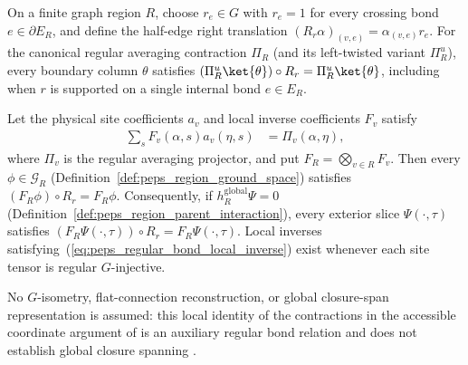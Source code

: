\begin{lemma}%
    \label{lem:peps_regular_region_bond_right_invariance}
    \leanok
    On a finite graph region $R$, choose $r_e\in G$ with $r_e=1$ for every
    crossing bond $e\in\partial E_R$, and define the half-edge right
    translation $(R_r\alpha)_{(v,e)}=\alpha_{(v,e)}r_e$. For the canonical
    regular averaging contraction $\Pi_R$ (and its left-twisted variant
    $\Pi_R^u$), every boundary column $\theta$ satisfies
    $(\Pi_R^u\ket{\theta})\circ R_r=\Pi_R^u\ket{\theta}$, including when $r$
    is supported on a single internal bond $e\in E_R$.

    Let the physical site coefficients $a_v$ and local inverse coefficients
    $F_v$ satisfy
    \begin{align}
        \sum_s F_v(\alpha,s)a_v(\eta,s) & = \Pi_v(\alpha,\eta),
        \label{eq:peps_regular_bond_local_inverse}
    \end{align}
    where $\Pi_v$ is the regular averaging projector, and put
    $F_R=\bigotimes_{v\in R}F_v$. Then every $\phi\in\mathcal G_R$
    (Definition~\ref{def:peps_region_ground_space}) satisfies
    $(F_R\phi)\circ R_r=F_R\phi$. Consequently, if
    $h_R^{\mathrm{global}}\Psi=0$
    (Definition~\ref{def:peps_region_parent_interaction}), every exterior
    slice $\Psi(\cdot,\tau)$ satisfies
    $(F_R\Psi(\cdot,\tau))\circ R_r=F_R\Psi(\cdot,\tau)$. Local inverses
    satisfying~(\ref{eq:peps_regular_bond_local_inverse}) exist whenever each
    site tensor is regular $G$-injective.

    No $G$-isometry, flat-connection reconstruction, or global
    closure-span representation is assumed: this local
    identity of the contractions in the accessible
    coordinate argument of \cite{Schuch2010PEPS} is an auxiliary
    regular bond relation and does not establish global closure spanning
    \cite{gap:rmp_peps_quantum_double_g_isometry}.
\end{lemma}

